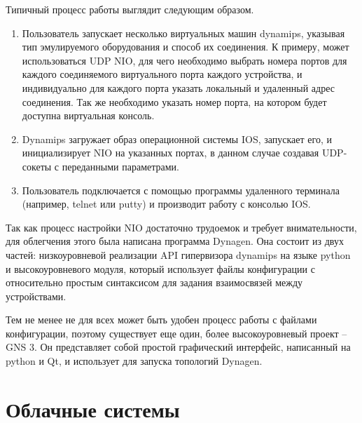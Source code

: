 Типичный процесс работы выглядит следующим образом.
\begin{enumerate}
    \item Пользователь запускает несколько виртуальных машин dynamips, указывая тип
    эмулируемого оборудования и способ их соединения. К примеру, может использоваться
    UDP NIO, для чего необходимо выбрать номера портов для каждого соединяемого
    виртуального порта каждого устройства, и индивидуально для каждого порта указать
    локальный и удаленный адрес соединения.
    Так же необходимо указать номер порта, на котором будет доступна виртуальная консоль.
    \item Dynamips загружает образ операционной системы IOS, запускает его, и инициализирует
    NIO на указанных портах, в данном случае создавая UDP-сокеты с переданными параметрами.
    \item Пользователь подключается с помощью программы удаленного терминала (например,
    telnet или putty) и производит работу с консолью IOS.
\end{enumerate}

Так как процесс настройки NIO достаточно трудоемок и требует внимательности, для облегчения
этого была написана программа Dynagen.\cite{website:dynagen} Она состоит из двух частей:
низкоуровневой реализации API гипервизора dynamips на языке python и высокоуровневого
модуля, который использует файлы конфигурации с относительно простым синтаксисом
для задания взаимосвязей между устройствами.

Тем не менее не для всех может быть удобен процесс работы с файлами конфигурации, 
поэтому существует еще один, более высокоуровневый проект -- GNS 3.\cite{website:gns3}
Он представляет собой простой графический интерфейс, написанный на python и Qt, и использует
для запуска топологий Dynagen.

\section{Облачные системы}

